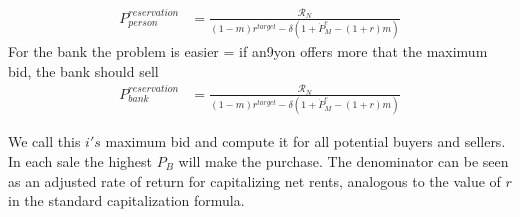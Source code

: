 \begin{eqnarray}
P_{person}^{reservation} & =   \frac{\mathcal{R}_N}{(1-m)r^{target}-\delta \left(1 + \dot P_M^e - (1+r)m\right)} \label{eqn-res-price-P} \end{eqnarray}
For the bank the problem is easier = if an9yon offers more that the maximum bid, the bank should sell
\begin{eqnarray}
P_{bank}^{reservation} & =    \frac{\mathcal{R}_N}{(1-m)r^{target}-\delta \left(1 + \dot P_M^e - (1+r)m\right)} \label{eqn-res-price-B} \end{eqnarray}

We call this  $i's$ maximum bid and compute it for all potential buyers and sellers. In each sale the highest $P_B$ will make the purchase. The denominator can be seen as an adjusted rate of return for capitalizing net rents, analogous to the value of $r$ in  the standard capitalization formula. 






